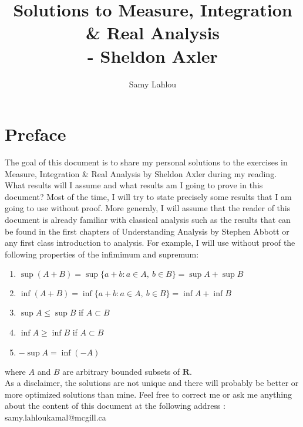 \documentclass[12pt, oneside]{book}
\title{Solutions to Measure, Integration \& Real Analysis
\\ - Sheldon Axler}
\author{Samy Lahlou}
\newcommand{\R}{\mathbf{R}}
\newcounter{exercise}[section] %
\begin{document}
\maketitle

\chapter*{Preface}

The goal of this document is to share my personal solutions to the exercises in Measure, Integration \& Real Analysis by Sheldon Axler during my reading. \\ 
What results will I assume and what results am I going to prove in this document? Most of the time, I will try to state precisely some results that I am going to use without proof. More generaly, I will assume that the reader of this document is already familiar with classical analysis such as the results that can be found in the first chapters of Understanding Analysis by Stephen Abbott or any first class introduction to analysis. For example, I will use without proof the following properties of the infimimum and supremum:
\begin{enumerate}
    \item $\sup(A+B) = \sup\{a+b : a\in A, \ b\in B\} = \sup A + \sup B$
    \item $\inf(A+B) = \inf\{a+b : a\in A, \ b\in B\} = \inf A + \inf B$
    \item $\sup A \leq \sup B$ if $A \subset B$
    \item $\inf A \geq \inf B$ if $A \subset B$
    \item $-\sup A = \inf (-A)$
\end{enumerate}
where $A$ and $B$ are arbitrary bounded subsets of $\R$. \\
As a disclaimer, the solutions are not unique and there will probably be better or more optimized solutions than mine. Feel free to correct me or ask me anything about the content of this document at the following address : samy.lahloukamal@mcgill.ca

\tableofcontents









\end{document}

